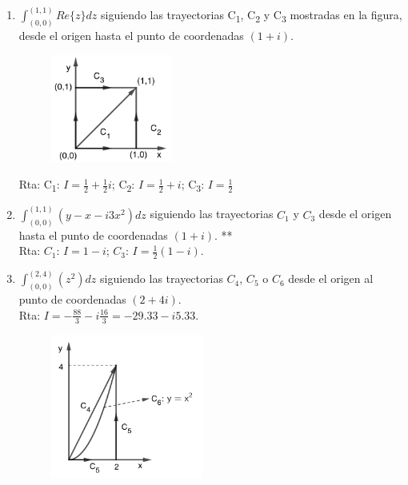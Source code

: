 \documentclass[10pt,a4paper]{article}
\begin{document}
\begin{enumerate}
\begin{enumerate}
	\item %
	$ \int_{(0,0)}^{(1,1)} Re\{z\} dz $	siguiendo las trayectorias C\textsubscript{1}, 
	C\textsubscript{2} y C\textsubscript{3} mostradas en la figura, 
	desde el origen hasta el punto de coordenadas $(1+i)$.
	
	\begin{figure}[!htbp]
		\centering
		\includegraphics[width=4cm]{tp3_3a.png}
		\label{fig:ej3a}
	\end{figure}

	Rta:	C\textsubscript1: $I=\frac{1}{2}+\frac{1}{2}i$; C\textsubscript2: $I=\frac{1}{2}+i$; C\textsubscript3: $I=\frac{1}{2}$
	
	\item %
	$ \int_{(0,0)}^{(1,1)} (y-x-i3x^2)dz $	siguiendo las trayectorias $C_1$ y $C_3$
	desde el origen hasta el punto de coordenadas $(1+i)$. ** 	\\
	Rta: $C_1$: $I=1-i$; $C_3$: $I=\frac{1}{2}(1-i)$.									

	\item %
	$ \int_{(0,0)}^{(2,4)}(z^2)dz $ siguiendo las trayectorias $C_4$, $C_5$ o $C_6$ desde el origen al punto de coordenadas $(2+4i)$. \\
	Rta: $I=-\frac{88}{3}-i\frac{16}{3}=-29.33-i5.33$.									

	\begin{figure}[!htbp]
		\centering
		\includegraphics[width=5cm]{tp3_3c.png}
		\label{fig:ej3c}
	\end{figure}

\end{enumerate}


\end{enumerate}
\end{document}
